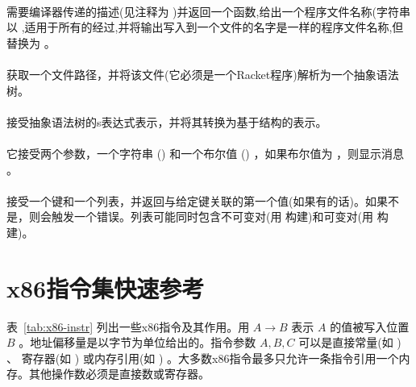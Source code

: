 \documentclass[11pt]{book}
\begin{document}
\paragraph{}

需要编译器传递的描述(见注释为
 )并返回一个函数,给出一个程序文件名称(字符串以  ,适用于所有的经过,并将输出写入到一个文件的名字是一样的程序文件名称,但  替换为  。


\paragraph{}

获取一个文件路径，并将该文件(它必须是一个Racket程序)解析为一个抽象语法树。

\paragraph{}

接受抽象语法树的s表达式表示，并将其转换为基于结构的表示。

\paragraph{}

它接受两个参数，一个字符串 () 和一个布尔值 () ，如果布尔值为  ，则显示消息 。

\paragraph{}

接受一个键和一个列表，并返回与给定键关联的第一个值(如果有的话)。如果不是，则会触发一个错误。列表可能同时包含不可变对(用
 构建)和可变对(用  构建)。


\section{x86指令集快速参考}
\label{sec:x86-quick-reference}

表~\ref{tab:x86-instr} 列出一些x86指令及其作用。用 $A \to B$ 表示 $A$ 的值被写入位置 $B$ 。地址偏移量是以字节为单位给出的。指令参数 $A, B, C$ 可以是直接常量(如 ) 、
寄存器(如 ) 或内存引用(如
) 。大多数x86指令最多只允许一条指令引用一个内存。其他操作数必须是直接数或寄存器。
\end{document}
